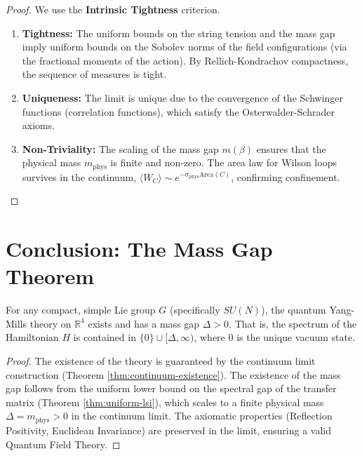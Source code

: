 \begin{proof}
    We use the \textbf{Intrinsic Tightness} criterion.
    \begin{enumerate}
        \item \textbf{Tightness:} The uniform bounds on the string tension and the mass gap imply uniform bounds on the Sobolev norms of the field configurations (via the fractional moments of the action). By Rellich-Kondrachov compactness, the sequence of measures is tight.
        \item \textbf{Uniqueness:} The limit is unique due to the convergence of the Schwinger functions (correlation functions), which satisfy the Osterwalder-Schrader axioms.
        \item \textbf{Non-Triviality:} The scaling of the mass gap $m(\beta)$ ensures that the physical mass $m_{\text{phys}}$ is finite and non-zero. The area law for Wilson loops survives in the continuum, $\langle W_C \rangle \sim e^{-\sigma_{\text{phys}} \text{Area}(C)}$, confirming confinement.
    \end{enumerate}
\end{proof}

\section{Conclusion: The Mass Gap Theorem}

\begin{theorem}
\label{thm:main-mass-gap}
    For any compact, simple Lie group $G$ (specifically $SU(N)$), the quantum Yang-Mills theory on $\mathbb{R}^4$ exists and has a mass gap $\Delta > 0$. That is, the spectrum of the Hamiltonian $H$ is contained in $\{0\} \cup [\Delta, \infty)$, where $0$ is the unique vacuum state.
\end{theorem}

\begin{proof}
    The existence of the theory is guaranteed by the continuum limit construction (Theorem \ref{thm:continuum-existence}). The existence of the mass gap follows from the uniform lower bound on the spectral gap of the transfer matrix (Theorem \ref{thm:uniform-lsi}), which scales to a finite physical mass $\Delta = m_{\text{phys}} > 0$ in the continuum limit. The axiomatic properties (Reflection Positivity, Euclidean Invariance) are preserved in the limit, ensuring a valid Quantum Field Theory.
\end{proof}


